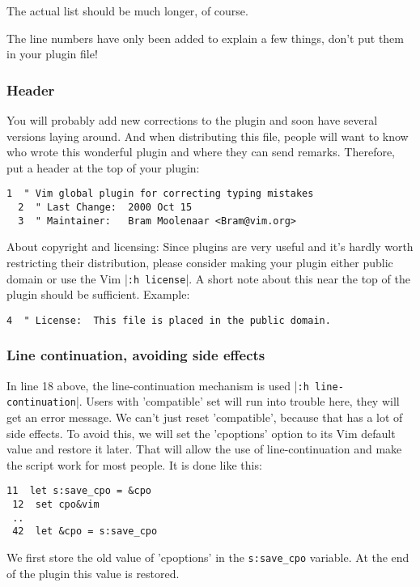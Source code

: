 The actual list should be much longer, of course.

The line numbers have only been added to explain a few things, don't put them in your plugin file!
\subsubsection{Header}
You will probably add new corrections to the plugin and soon have several versions laying around.
And when distributing this file, people will want to know who wrote this wonderful plugin and where they can send remarks.
Therefore, put a header at the top of your plugin:

\begin{Verbatim}[samepage=true]
  1  " Vim global plugin for correcting typing mistakes
  2  " Last Change:  2000 Oct 15
  3  " Maintainer:   Bram Moolenaar <Bram@vim.org>
\end{Verbatim}

About copyright and licensing: Since plugins are very useful and it's hardly worth restricting their distribution, please consider making your plugin either public domain or use the Vim |\verb!:h license!|.
A short note about this near the top of the plugin should be sufficient.
Example:

\begin{Verbatim}[samepage=true]
  4  " License:  This file is placed in the public domain.
\end{Verbatim}

\subsubsection{Line continuation, avoiding side effects}
\label{use-cpo-save}

In line 18 above, the line-continuation mechanism is used |\verb!:h line-continuation!|.
Users with 'compatible' set will run into trouble here, they will get an error message.
We can't just reset 'compatible', because that has a lot of side effects.
To avoid this, we will set the 'cpoptions' option to its Vim default value and restore it later.
That will allow the use of line-continuation and make the script work for most people.
It is done like this:

\begin{Verbatim}[samepage=true]
 11  let s:save_cpo = &cpo
 12  set cpo&vim
 ..
 42  let &cpo = s:save_cpo
\end{Verbatim}

We first store the old value of 'cpoptions' in the \verb!s:save_cpo! variable.
At the end of the plugin this value is restored.


